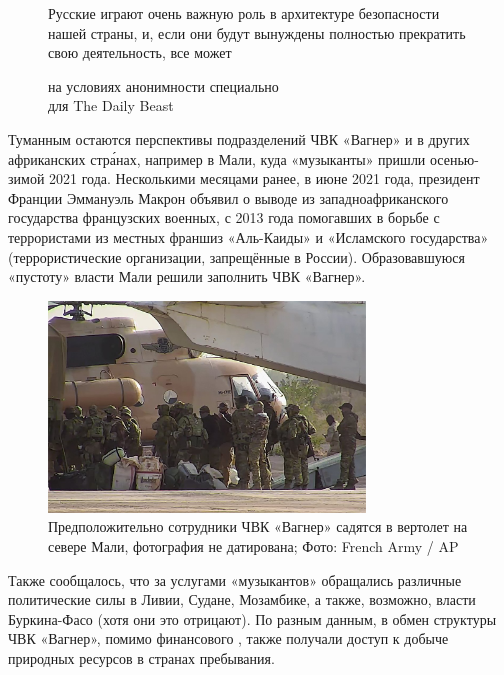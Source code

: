 \begin{figure}
    \begin{fancyquotes}
        Русские играют очень важную роль в архитектуре безопасности нашей страны, и, если они будут вынуждены полностью прекратить свою деятельность, все может \\

        \begin{flushright}
            на условиях анонимности специально\\

            для The Daily Beast
        \end{flushright}
    \end{fancyquotes}
\end{figure}
Туманным остаются перспективы подразделений ЧВК «Вагнер» и в других африканских стр\'{а}нах, например в Мали, куда «музыканты» пришли осенью-зимой 2021 года. Несколькими месяцами ранее, в июне 2021 года, президент Франции Эммануэль Макрон объявил о выводе из западноафриканского государства французских военных, с 2013 года помогавших в борьбе с террористами из местных франшиз «Аль-Каиды» и «Исламского государства» (террористические организации, запрещённые в России). Образовавшуюся «пустоту» власти Мали решили заполнить ЧВК «Вагнер».

\begin{figure}[h]
    \centering
    \includegraphics[width=0.75\textwidth]{img/pmc_africa_1.jpg}
    \caption{Предположительно сотрудники ЧВК «Вагнер» садятся в вертолет на севере Мали, фотография не датирована; Фото: French Army / AP}
\end{figure}

Также сообщалось, что за услугами «музыкантов» обращались различные политические силы в Ливии, Судане, Мозамбике, а также, возможно, власти Буркина-Фасо (хотя они это отрицают). По разным данным, в обмен структуры ЧВК «Вагнер», помимо финансового , также получали доступ к добыче природных ресурсов в странах пребывания.

